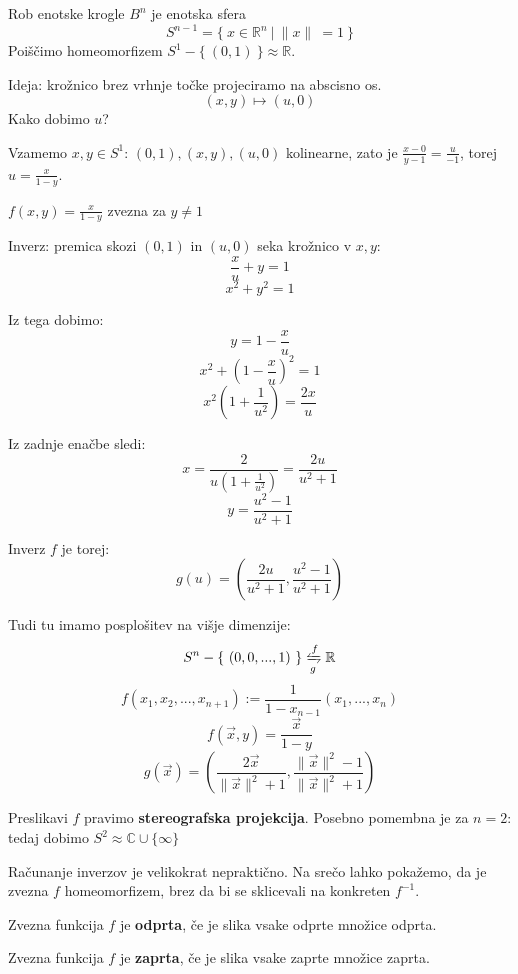 \documentclass[11pt, a4paper]{article}
\begin{document}
    \begin{example}
        Rob enotske krogle \(B^n\) je enotska sfera 
        \[S^{n-1} = \{\ x \in \mathbb{R}^n\ |\ \parallel x \parallel\ = 1\ \}\]
        Poiščimo homeomorfizem \(S^1 - \{\ (0,1)\ \} \approx \mathbb{R}\).

        \par
        Ideja: krožnico brez vrhnje točke projeciramo na abscisno os.
        \[(x,y) \mapsto (u,0)\]
        Kako dobimo \(u\)? 
        \par
        Vzamemo \(x,y \in S^1\): \((0,1), (x,y),(u,0)\) kolinearne, zato je \(\frac{x-0}{y-1} = \frac{u}{-1}\), torej \(u = \frac{x}{1-y}\).
        \begin{center}
            \(f(x,y) = \frac{x}{1 - y}\) zvezna za \(y \neq 1\)
        \end{center}
        Inverz: premica skozi \((0,1)\) in \((u,0)\) seka krožnico v \(x,y\):
        \[\frac{x}{u} + y = 1\]
        \[x^2 + y^2 = 1\]

        Iz tega dobimo:
        \[y = 1 - \frac{x}{u}\]
        \[x^2 + (1 - \frac{x}{u})^2 = 1\]
        \[x^2 (1 + \frac{1}{u^2}) = \frac{2x}{u}\]

        Iz zadnje enačbe sledi:
        \[x = \frac{2}{u(1+\frac{1}{u^2})} = \frac{2u}{u^2 + 1}\]
        \[y = \frac{u^2 - 1}{u^2 + 1}\]

        Inverz \(f\) je torej:
        \[g(u) = (\frac{2u}{u^2 + 1}, \frac{u^2 - 1}{u^2 + 1})\]

        Tudi tu imamo posplošitev na višje dimenzije:
        \[S^n - \{\ (0,0,...,1)\ \} \xleftrightharpoons[g]{f} \mathbb{R}\]
        \[f(x_1,x_2,...,x_{n+1}) := \frac{1}{1-x_{n-1}} (x_1,...,x_n)\]
        \[f(\vec{x}, y) = \frac{\vec{x}}{1-y}\]
        \[g(\vec{x}) = (\frac{2\vec{x}}{\parallel \vec{x} \parallel^2 + 1}, \frac{\parallel \vec{x} \parallel^2 - 1}{\parallel \vec{x} \parallel^2 + 1})\]

        Preslikavi \(f\) pravimo \textbf{stereografska projekcija}. Posebno pomembna je za \(n=2\): tedaj dobimo \(S^2 \approx \mathbb{C} \cup \{ \infty \}\)
    \end{example}

    Računanje inverzov je velikokrat nepraktično. Na srečo lahko pokažemo, da je zvezna \(f\) homeomorfizem, brez da bi se sklicevali na konkreten \(f^{-1}\).

    \begin{definition}
        Zvezna funkcija \(f\) je \textbf{odprta}, če je slika vsake odprte množice odprta.
        \par
        Zvezna funkcija \(f\) je \textbf{zaprta}, če je slika vsake zaprte množice zaprta.
    \end{definition}
\end{document}
